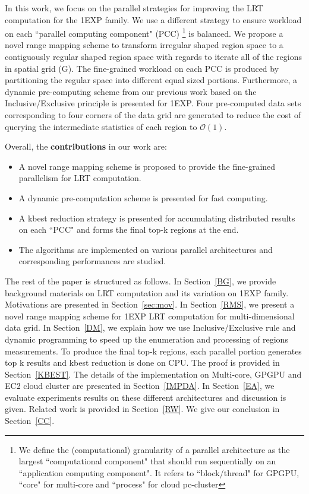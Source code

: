 \documentclass[AMA,LATO1COL]{WileyNJD-v2-bak}
\newcommand\bigo{\mathcal O}
\begin{document}
\noindent In this work, we focus on the parallel strategies for improving the LRT computation for the 1EXP family. We use a different strategy to ensure workload on each ``parallel computing component" (PCC) \footnote{We define the (computational) granularity of a parallel architecture as the largest ``computational component" that should run sequentially on an ``application computing component". It refers to ``block/thread" for GPGPU, ``core" for multi-core and ``process" for cloud pc-cluster} is balanced. We propose a novel range mapping scheme to transform irregular shaped region space to a contiguously regular shaped region space with regards to iterate all of the regions in spatial grid (G). The fine-grained workload on each PCC is produced by partitioning the regular space into different equal sized portions. Furthermore, a dynamic pre-computing scheme from our previous work\cite{apweb} based on the Inclusive/Exclusive principle is presented for 1EXP. Four pre-computed data sets corresponding to four corners of the data grid are generated to reduce the cost of querying the intermediate statistics of each region to $\bigo(1)$.

Overall, the {\bf contributions} in our work are:
\begin{itemize}
\renewcommand{\labelitemi}{$\bullet$}
\item A novel range mapping scheme is proposed to provide the fine-grained parallelism for LRT computation.
\item A dynamic pre-computation scheme is presented for fast computing.
\item A kbest reduction strategy is presented for accumulating distributed results on each ``PCC" and forms the final top-k regions at the end.
\item The algorithms are implemented on various parallel architectures and corresponding performances are studied.
\end{itemize}

The rest of the paper is structured as follows. In Section~\ref{BG}, we provide
background materials on LRT computation and its variation on 1EXP family. Motivations are presented in Section~\ref{sec:mov}.  In Section~\ref{RMS}, we present a novel range mapping scheme for 1EXP LRT computation for multi-dimensional data grid. In Section~\ref{DM}, we explain how we use
Inclusive/Exclusive rule and dynamic programming to speed up the enumeration and
processing of regions measurements. To produce the final top-k regions, each parallel portion generates top k results and kbest reduction is done on CPU. The proof is provided in Section~\ref{KBEST}. The details of the implementation on Multi-core, GPGPU and EC2 cloud cluster are presented in
Section~\ref{IMPDA}. In Section~\ref{EA}, we evaluate experiments results on these different architectures and discussion is given. Related
work is provided in Section~\ref{RW}. We give our conclusion in
Section~\ref{CC}.
\end{document}
